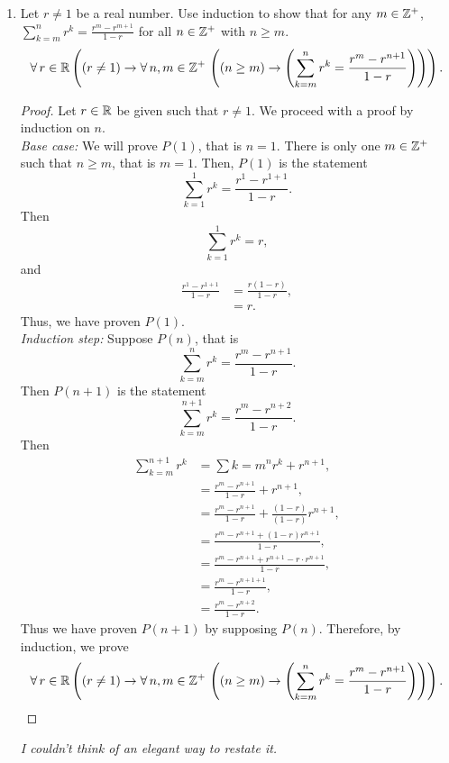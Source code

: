 \documentclass[a4paper, 12pt]{../../config/homework}
\begin{document}
\begin{enumerate}
\pagebreak
\item Let $r\ne 1$ be a real number. Use induction to show that for any $m\in\mathbb{Z}^+$,\\$\sum_{k=m}^{n}{r^k} = \frac{r^m - r^{m+1}}{1-r}$ for all $n\in\mathbb{Z}^+$ with $n \ge m$.
\[\forall\, r\in\mathbb{R} \left((r\neq 1) \rightarrow \forall\, n,m\in\mathbb{Z}^+\,\left((n \geq m) \rightarrow \left( \sum_{k=m}^{n}{r^k} = \frac{r^m - r^{n+1}}{1-r} \right)\right)\right).\]
\begin{proof}
Let $r\in\mathbb{R}$ be given such that $r\ne 1$.
We proceed with a proof by induction on $n$.
\\\textit{Base case:} We will prove $P(1)$, that is $n=1$.
There is only one $m\in\mathbb{Z}^+$ such that $n \geq m$, that is $m=1$.
Then, $P(1)$ is the statement
\[\sum_{k=1}^{1} r^k = \frac{r^1 - r^{1+1}}{1-r}.\]
Then
\[\sum_{k=1}^{1} r^k = r,\]
and
\begin{align*}
\frac{r^1 - r^{1+1}}{1-r} &= \frac{r(1-r)}{1-r},\\
&= r.
\end{align*}
Thus, we have proven $P(1)$.
\\\textit{Induction step:} Suppose $P(n)$, that is
\[\sum_{k=m}^{n} r^k = \frac{r^m - r^{n+1}}{1-r}.\]
Then $P(n+1)$ is the statement
\[\sum_{k=m}^{n+1}{r^k} = \frac{r^m - r^{n+2}}{1-r}.\]
Then
\begin{align*}
\sum_{k=m}^{n+1}{r^k} &= \sum{k=m}^n r^k + r^{n+1},\\
&= \frac{r^m - r^{n+1}}{1-r} + r^{n+1},\\
&= \frac{r^m - r^{n+1}}{1-r} + \frac{(1-r)}{(1-r)}r^{n+1},\\
&= \frac{r^m - r^{n+1} + (1-r)r^{n+1}}{1-r},\\
&= \frac{r^m - r^{n+1} + r^{n+1} - r\cdot r^{n+1}}{1-r},\\
&= \frac{r^m - r^{n+1+1}}{1-r},\\
&= \frac{r^m - r^{n+2}}{1-r}.
\end{align*}
Thus we have proven $P(n+1)$ by supposing $P(n)$. Therefore, by induction, we prove
\[\forall\, r\in\mathbb{R} \left((r\neq 1) \rightarrow \forall\, n,m\in\mathbb{Z}^+\,\left((n \geq m) \rightarrow \left( \sum_{k=m}^{n}{r^k} = \frac{r^m - r^{n+1}}{1-r} \right)\right)\right).\]
\end{proof}
\textit{I couldn't think of an elegant way to restate it.}


\end{enumerate}
\end{document}
